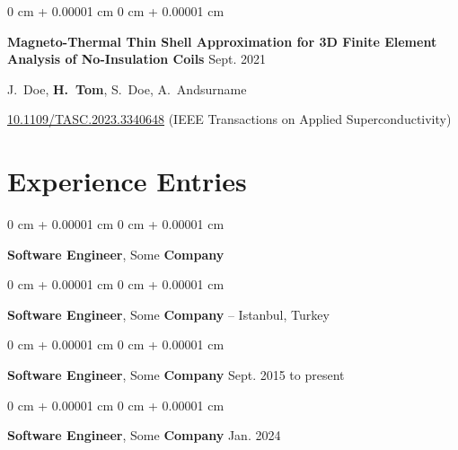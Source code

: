 \documentclass[10pt, letterpaper]{article}
\newenvironment{onecolentry}{
    \begin{adjustwidth}{
        0 cm + 0.00001 cm
    }{
        0 cm + 0.00001 cm
    }
}{
    \end{adjustwidth}
} %
\begin{document}
        \vspace{0.1 cm}

        \begin{onecolentry}
            \begin{minipage}{\linewidth}
                \textbf{Magneto-Thermal Thin Shell Approximation for 3D Finite Element Analysis of No-Insulation Coils} \hfill Sept. 2021

                \vspace{0.10 cm}

                \mbox{J. Doe}, \mbox{\textbf{H. Tom}}, \mbox{S. Doe}, \mbox{A. Andsurname}
                \vspace{0.10 cm}

        \href{https://doi.org/10.1109/TASC.2023.3340648}{10.1109/TASC.2023.3340648} (IEEE Transactions on Applied Superconductivity)\end{minipage}
        \end{onecolentry}


    
    \section{Experience Entries}

        
        \begin{onecolentry}
            \textbf{Software Engineer}, Some \textbf{Company} \hfill 
        \end{onecolentry}

        \vspace{0.1 cm}

        \begin{onecolentry}
            \textbf{Software Engineer}, Some \textbf{Company} -- Istanbul, Turkey \hfill 
        \end{onecolentry}

        \vspace{0.1 cm}

        \begin{onecolentry}
            \textbf{Software Engineer}, Some \textbf{Company} \hfill Sept. 2015 to present
        \end{onecolentry}

        \vspace{0.1 cm}

        \begin{onecolentry}
            \textbf{Software Engineer}, Some \textbf{Company} \hfill Jan. 2024
        \end{onecolentry}
\end{document}
